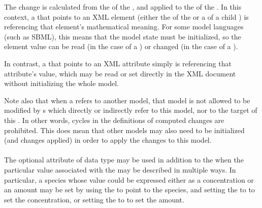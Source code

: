 The change is calculated from the \Math of the \Calculation, and applied to the  of the \Change.  In this context, a  that points to an XML element (either the  of the \ComputeChange or a  of a child \Variable) is referencing that element's mathematical meaning.  For some model languages (such as SBML), this means that the model state must be initialized, so the element value can be read (in the case of a \Variable) or changed (in the case of a \ComputeChange).

In contrast, a  that points to an XML attribute simply is referencing that attribute's value, which may be read or set directly in the XML document without initializing the whole model.

Note also that when a  refers to another model, that model is not allowed to be modified by s which directly or indirectly refer to this model, nor to the target of this \ComputeChange. In other words, cycles in the definitions of computed changes are prohibited.  This does mean that other models may also need to be initialized (and changes applied) in order to apply the changes to this model.

\paragraph*{}
\label{sec:cc_symbol}
The optional  attribute of data type  may be used in addition to the  when the particular value associated with the  may be described in multiple ways.  In particular, a species whose value could be expressed either as a concentration or an amount may be set by using the  to point to the species, and setting the  to  to set the concentration, or setting the  to  to set the amount.


